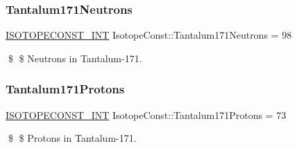 \subsubsection{\texorpdfstring{Tantalum171\+Neutrons}{Tantalum171Neutrons}}
{\footnotesize\ttfamily \mbox{\hyperlink{group___isotope_const-_macros_ga5f18360b3e99483a35c32d789e62621c}{I\+S\+O\+T\+O\+P\+E\+C\+O\+N\+S\+T\+\_\+\+I\+NT}} Isotope\+Const\+::\+Tantalum171\+Neutrons = 98}

\$ \$ Neutrons in Tantalum-\/171. \mbox{\label{group___isotope_const-_tantalum-_ta171_gacc410ca46214a6af17f7c9264a5258b7}} 
\subsubsection{\texorpdfstring{Tantalum171\+Protons}{Tantalum171Protons}}
{\footnotesize\ttfamily \mbox{\hyperlink{group___isotope_const-_macros_ga5f18360b3e99483a35c32d789e62621c}{I\+S\+O\+T\+O\+P\+E\+C\+O\+N\+S\+T\+\_\+\+I\+NT}} Isotope\+Const\+::\+Tantalum171\+Protons = 73}

\$ \$ Protons in Tantalum-\/171. 